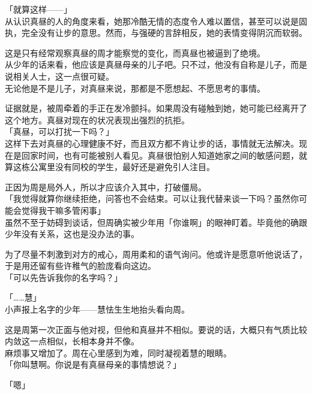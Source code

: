 「就算这样——」\\

从认识真昼的人的角度来看，她那冷酷无情的态度令人难以置信，甚至可以说是固执，完全没有让步的意思。然而，与强硬的言辞相反，她的表情变得阴沉而软弱。

这是只有经常观察真昼的周才能察觉的变化，而真昼也被逼到了绝境。\\

从少年的话来看，他应该是真昼母亲的儿子吧。只不过，他没有自称是儿子，而是说相关人士，这一点很可疑。\\

无论他是不是儿子，对真昼来说，那都是不愿想起、不愿思考的事情。

证据就是，被周牵着的手正在发冷颤抖。如果周没有碰触到她，她可能已经离开了这个地方。真昼对现在的状况表现出强烈的抗拒。\\

「真昼，可以打扰一下吗？」\\

这样下去对真昼的心理健康不好，而且双方都不肯让步的话，事情就无法解决。现在是回家时间，也有可能被别人看见。真昼很怕别人知道她家之间的敏感问题，就算这栋公寓里没有同校的学生，最好还是避免引人注目。

正因为周是局外人，所以才应该介入其中，打破僵局。\\

「我觉得就算你继续拒绝，问答也不会结束。可以让我代替来谈一下吗？虽然你可能会觉得我干嘛多管闲事」\\

虽然不至于妨碍到谈话，但周确实被少年用「你谁啊」的眼神盯着。毕竟他的确跟少年没有关系，这也是没办法的事。

为了尽量不刺激到对方的戒心，周用柔和的语气询问。他或许是愿意听他说话了，于是用还留有些许稚气的脸庞看向这边。\\

「可以先告诉我你的名字吗？」

「……慧」\\

小声报上名字的少年——慧怯生生地抬头看向周。

这是周第一次正面与他对视，但他和真昼并不相似。要说的话，大概只有气质比较内敛这一点相似，长相本身并不像。\\

麻烦事又增加了。周在心里感到为难，同时凝视着慧的眼睛。\\

「你叫慧啊。你说是有真昼母亲的事情想说？」

「嗯」

